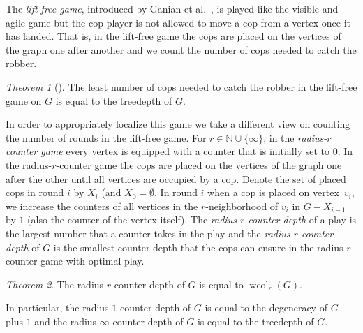 \documentclass[1p,number,a4paper]{elsarticle}
\theoremstyle{remark}
\newcommand{\N}{\mathbb{N}}
\DeclareMathOperator{\wcol}{wcol}
\newtheorem{theorem}{Theorem}[section]
\begin{document}
\medskip
The \emph{lift-free game}, introduced by Ganian et al.~\cite{ganian2009digraph}, is played like the visible-and-agile game but the cop player is not allowed to move a cop from a vertex once it has landed. 
That is, in the lift-free game the cops are placed on the vertices of the graph one after another and we count the number of cops needed to catch the robber. 

\begin{theorem}[\cite{ganian2009digraph}]
    The least number of cops needed to catch the robber 
in the lift-free game on $G$ is equal to the treedepth of $G$. 
\end{theorem}

In order to appropriately localize this game we take a different view on counting the number of rounds in the lift-free game. 
For $r\in \N\cup\{\infty\}$, in the \emph{radius-$r$ counter game} every vertex is equipped with a counter that is initially set to $0$. 
In the radius-$r$-counter game the cops are placed on the vertices of the graph one after the other until all vertices are occupied by a cop. 
Denote the set of placed cops in round $i$ by $X_i$ (and $X_0=\emptyset$. 
In round $i$ when a cop is placed on vertex~$v_i$, we increase the counters of all vertices in the $r$-neighborhood of $v_i$ in $G-X_{i-1}$ by $1$ (also the counter of the vertex itself). 
The \emph{radius-$r$ counter-depth} of a play is the largest number that a counter takes in the play and the \emph{radius-$r$ counter-depth} of $G$ is the smallest counter-depth that the cops can ensure in the radius-$r$-counter game with optimal play. 

\begin{theorem}
    The radius-$r$ counter-depth of $G$ is equal to $\wcol_r(G)$. 
\end{theorem}

In particular, the radius-$1$ counter-depth of $G$ is equal to the degeneracy of $G$ plus $1$ and the radius-$\infty$ counter-depth of $G$ is equal to the treedepth of $G$. 
\end{document}
